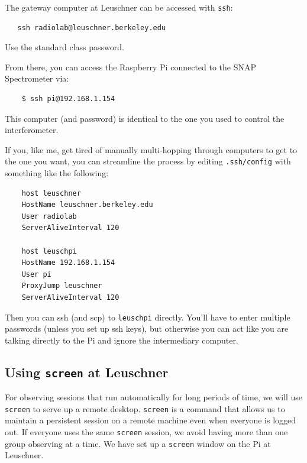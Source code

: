 \documentclass[psfig,preprint]{aastex}
\begin{document}
\noindent
The gateway computer at Leuschner can be accessed with {\tt ssh}:
\begin{verbatim}
   ssh radiolab@leuschner.berkeley.edu
\end{verbatim}
\noindent
Use the standard class password.

From there, you can access the Raspberry Pi connected to the SNAP Spectrometer via:
\begin{verbatim}
    $ ssh pi@192.168.1.154
\end{verbatim}
This computer (and password) is identical to the one you used to control the interferometer.

If you, like me, get tired of manually multi-hopping through computers to get to the one you want,
you can streamline the process by editing \texttt{.ssh/config} with something like the following:
\begin{verbatim}
    host leuschner
    HostName leuschner.berkeley.edu
    User radiolab
    ServerAliveInterval 120 

    host leuschpi
    HostName 192.168.1.154
    User pi
    ProxyJump leuschner
    ServerAliveInterval 120 
\end{verbatim}
Then you can ssh (and scp) to \texttt{leuschpi} directly. You'll have to enter multiple passwords
(unless you set up ssh keys), but otherwise you can act like you are talking directly to the Pi
and ignore the intermediary computer.

\subsection {Using \texttt{screen} at Leuschner}

\noindent
For observing sessions that run automatically for long periods of
time, we will use \texttt{screen} to serve up a remote desktop. \texttt{screen} is a command that allows us to maintain a persistent session on a remote machine even when everyone is logged out. If everyone uses the same \texttt{screen} session, we avoid having more than one group observing at a time.
We have set up a \texttt{screen} window on the Pi at Leuschner.  
\end{document}
